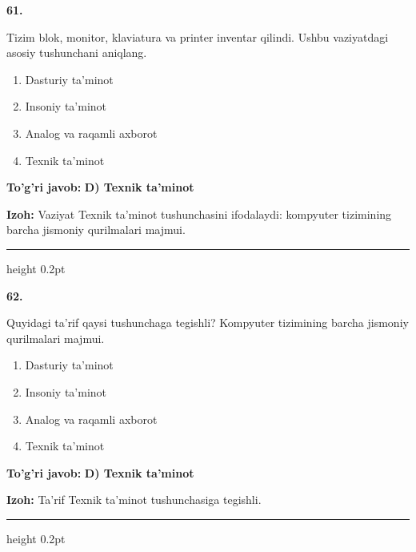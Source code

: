 \documentclass[10pt,a4paper,oneside]{article}
\begin{document}
\noindent\textbf{\color{ink}61.}
\par
Tizim blok, monitor, klaviatura va printer inventar qilindi. Ushbu vaziyatdagi asosiy tushunchani aniqlang.
\begin{enumerate}[label=\Alph*),leftmargin=9mm]
\item Dasturiy ta'minot
\item Insoniy ta'minot
\item Analog va raqamli axborot
\item Texnik ta'minot
\end{enumerate}
\begin{tcolorbox}[enhanced,breakable,colback=teal!4,colframe=teal!50!black,boxrule=0.5pt,arc=1.1mm,left=3mm,right=3mm,top=1.7mm,bottom=1.7mm,before skip=2mm,after skip=2mm]
\textbf{\color{teal}To'g'ri javob:} \textbf{D) Texnik ta'minot}
\par\smallskip
\textbf{Izoh:} Vaziyat Texnik ta'minot tushunchasini ifodalaydi: kompyuter tizimining barcha jismoniy qurilmalari majmui.
\end{tcolorbox}
\vspace{2mm}\hrule height 0.2pt \vspace{3mm}

\noindent\textbf{\color{ink}62.}
\par
Quyidagi ta'rif qaysi tushunchaga tegishli? Kompyuter tizimining barcha jismoniy qurilmalari majmui.
\begin{enumerate}[label=\Alph*),leftmargin=9mm]
\item Dasturiy ta'minot
\item Insoniy ta'minot
\item Analog va raqamli axborot
\item Texnik ta'minot
\end{enumerate}
\begin{tcolorbox}[enhanced,breakable,colback=teal!4,colframe=teal!50!black,boxrule=0.5pt,arc=1.1mm,left=3mm,right=3mm,top=1.7mm,bottom=1.7mm,before skip=2mm,after skip=2mm]
\textbf{\color{teal}To'g'ri javob:} \textbf{D) Texnik ta'minot}
\par\smallskip
\textbf{Izoh:} Ta'rif Texnik ta'minot tushunchasiga tegishli.
\end{tcolorbox}
\vspace{2mm}\hrule height 0.2pt \vspace{3mm}
\end{document}
